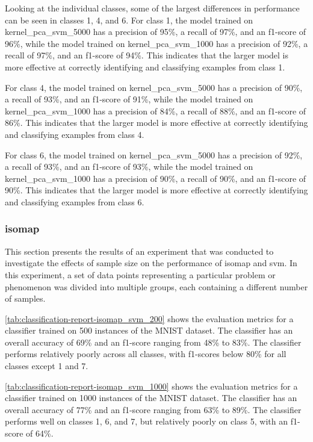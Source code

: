 Looking at the individual classes, some of the largest differences in performance can be seen in classes 1, 4, and 6. For class 1, the model trained on kernel\_pca\_svm\_5000 has a precision of 95\%, a recall of 97\%, and an f1-score of 96\%, while the model trained on kernel\_pca\_svm\_1000 has a precision of 92\%, a recall of 97\%, and an f1-score of 94\%. This indicates that the larger model is more effective at correctly identifying and classifying examples from class 1.

For class 4, the model trained on kernel\_pca\_svm\_5000 has a precision of 90\%, a recall of 93\%, and an f1-score of 91\%, while the model trained on kernel\_pca\_svm\_1000 has a precision of 84\%, a recall of 88\%, and an f1-score of 86\%. This indicates that the larger model is more effective at correctly identifying and classifying examples from class 4.

For class 6, the model trained on kernel\_pca\_svm\_5000 has a precision of 92\%, a recall of 93\%, and an f1-score of 93\%, while the model trained on kernel\_pca\_svm\_1000 has a precision of 90\%, a recall of 90\%, and an f1-score of 90\%. This indicates that the larger model is more effective at correctly identifying and classifying examples from class 6.

\subsubsection{\gls{isomap}}\label{subsubsec:experiment_4_isomap}
This section presents the results of an experiment that was conducted to investigate the effects of sample size on the performance of \gls{isomap} and \gls{svm}. In this experiment, a set of data points representing a particular problem or phenomenon was divided into multiple groups, each containing a different number of samples.



\ref{tab:classification-report-isomap_svm_200} shows the evaluation metrics for a classifier trained on 500 instances of the MNIST dataset. The classifier has an overall accuracy of 69\% and an f1-score ranging from 48\% to 83\%. The classifier performs relatively poorly across all classes, with f1-scores below 80\% for all classes except 1 and 7.



\ref{tab:classification-report-isomap_svm_1000} shows the evaluation metrics for a classifier trained on 1000 instances of the MNIST dataset. The classifier has an overall accuracy of 77\% and an f1-score ranging from 63\% to 89\%. The classifier performs well on classes 1, 6, and 7, but relatively poorly on class 5, with an f1-score of 64\%.


